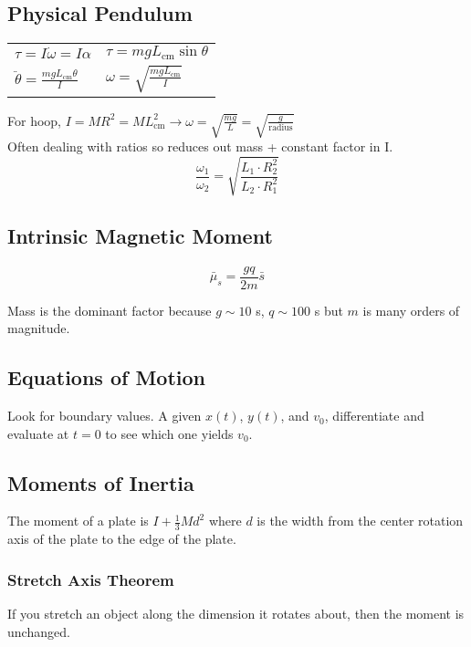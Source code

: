 \documentclass[10pt,letter]{article}
\begin{document}
\subsection{Physical Pendulum}
\begin{tabular}{l l}
$\tau = I \dot{\omega} = I \alpha$ & $\tau = mgL_{\textrm{cm}}\sin\theta$\\
$\ddot{\theta} = \frac{mgL_{\textrm{cm}}\theta}{I}$ & $\omega = \sqrt{\frac{mgL_{\textrm{cm}}}{I}}$
\end{tabular}

For hoop, $I=MR^2 = ML^2_{\textrm{cm}} \rightarrow \omega = \sqrt{\frac{mg}{L}} = \sqrt{\frac{g}{\textrm{radius}}}$\\
Often dealing with ratios so reduces out mass + constant factor in I.
\begin{equation}
 \frac{\omega_1}{\omega_2} = \sqrt{\frac{L_1 \cdot R^2_2}{L_2 \cdot R^2_1}}
\end{equation}

\subsection{Intrinsic Magnetic Moment}
\begin{equation}
 \bar{\mu}_s = \frac{gq}{2m}\bar{s} 
\end{equation}

Mass is the dominant factor because $g \sim 10$ s, $q \sim 100 $ s but $m$ is many orders of magnitude.

\subsection{Equations of Motion}
Look for boundary values. A given $x(t)$, $y(t)$, and $v_0$, differentiate and evaluate at $t=0$ to see which one yields $v_0$.

\subsection{Moments of Inertia}
The moment of a plate is $I+\frac{1}{3}Md^2$ where $d$ is the width from the center rotation axis of the plate to the edge of the plate. 

\subsubsection{Stretch Axis Theorem}
If you stretch an object along the dimension it rotates about, then the moment is unchanged.
\end{document}

